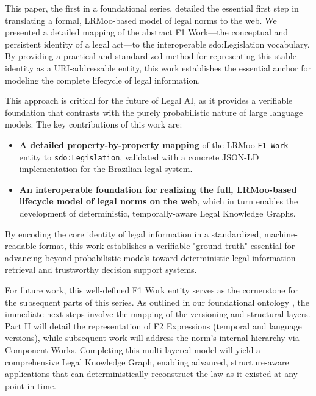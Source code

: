 \documentclass[11pt]{article}
\begin{document}
This paper, the first in a foundational series, detailed the essential first step in translating a formal, LRMoo-based model of legal norms \cite{demartim2025temporal} to the web. We presented a detailed mapping of the abstract F1 Work—the conceptual and persistent identity of a legal act—to the interoperable sdo:Legislation vocabulary. By providing a practical and standardized method for representing this stable identity as a URI-addressable entity, this work establishes the essential anchor for modeling the complete lifecycle of legal information.

This approach is critical for the future of Legal AI, as it provides a verifiable foundation that contrasts with the purely probabilistic nature of large language models. The key contributions of this work are:
\begin{itemize}
\item \textbf{A detailed property-by-property mapping} of the LRMoo \texttt{F1 Work} entity to \texttt{sdo:Legislation}, validated with a concrete JSON-LD implementation for the Brazilian legal system.
\item \textbf{An interoperable foundation for realizing the full, LRMoo-based lifecycle model of legal norms on the web}, which in turn enables the development of deterministic, temporally-aware Legal Knowledge Graphs.
\end{itemize}

By encoding the core identity of legal information in a standardized, machine-readable format, this work establishes a verifiable "ground truth" essential for advancing beyond probabilistic models toward deterministic legal information retrieval and trustworthy decision support systems.

For future work, this well-defined F1 Work entity serves as the cornerstone for the subsequent parts of this series. As outlined in our foundational ontology \cite{demartim2025temporal}, the immediate next steps involve the mapping of the versioning and structural layers. Part II will detail the representation of F2 Expressions (temporal and language versions), while subsequent work will address the norm's internal hierarchy via Component Works. Completing this multi-layered model will yield a comprehensive Legal Knowledge Graph, enabling advanced, structure-aware applications that can deterministically reconstruct the law as it existed at any point in time.

 

\end{document}
